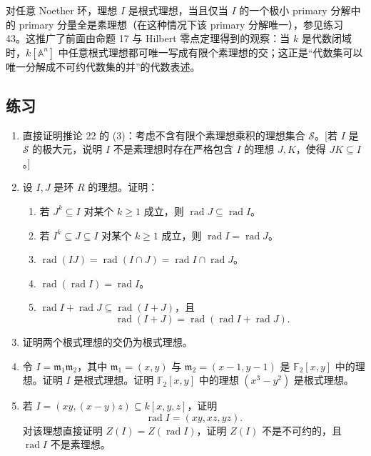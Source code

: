 对任意 Noether 环，理想 $I$ 是根式理想，当且仅当 $I$ 的一个极小 primary 分解中的 primary 分量全是素理想（在这种情况下该 primary 分解唯一），参见练习 43。这推广了前面由命题 17 与 Hilbert 零点定理得到的观察：当 $k$ 是代数闭域时，$k[\mathbb A^n]$ 中任意根式理想都可唯一写成有限个素理想的交；这正是“代数集可以唯一分解成不可约代数集的并”的代数表述。


\subsection*{练习}

\begin{enumerate}[label=\arabic*.]
	\item 直接证明推论 22 的 (3)：考虑不含有限个素理想乘积的理想集合 $\mathcal S$。[若 $I$ 是 $\mathcal S$ 的极大元，说明 $I$ 不是素理想时存在严格包含 $I$ 的理想 $J,K$，使得 $JK\subseteq I$。]
	
	\item 设 $I,J$ 是环 $R$ 的理想。证明：
	\begin{enumerate}[label=(\alph*)]
		\item 若 $J^k\subseteq I$ 对某个 $k\ge1$ 成立，则 $\operatorname{rad}J\subseteq\operatorname{rad}I$。
		\item 若 $I^k\subseteq J\subseteq I$ 对某个 $k\ge1$ 成立，则 $\operatorname{rad}I=\operatorname{rad}J$。
		\item $\operatorname{rad}(IJ)=\operatorname{rad}(I\cap J)=\operatorname{rad}I\cap\operatorname{rad}J$。
		\item $\operatorname{rad}(\operatorname{rad}I)=\operatorname{rad}I$。
		\item $\operatorname{rad}I+\operatorname{rad}J\subseteq\operatorname{rad}(I+J)$，且
		\[
		\operatorname{rad}(I+J)=\operatorname{rad}(\operatorname{rad}I+\operatorname{rad}J).
		\]
	\end{enumerate}
	
	\item 证明两个根式理想的交仍为根式理想。
	
	\item 令 $I=\mathfrak m_1\mathfrak m_2$，其中 $\mathfrak m_1=(x,y)$ 与 $\mathfrak m_2=(x-1,y-1)$ 是 $\mathbb F_2[x,y]$ 中的理想。证明 $I$ 是根式理想。证明 $\mathbb F_2[x,y]$ 中的理想 $(x^3-y^2)$ 是根式理想。
	
	\item 若 $I=(xy,(x-y)z)\subseteq k[x,y,z]$，证明
	\[
	\operatorname{rad}I=(xy,xz,yz).
	\]
	对该理想直接证明 $Z(I)=Z(\operatorname{rad}I)$，证明 $Z(I)$ 不是不可约的，且 $\operatorname{rad}I$ 不是素理想。
	

\end{enumerate}
